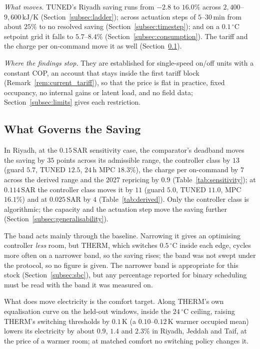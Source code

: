 \documentclass[3p,twocolumn,number]{elsarticle}
\newcommand{\SAR}{\text{SAR}}
\begin{document}
\emph{What moves.} TUNED's Riyadh saving runs from $-2.8$ to $16.0\%$ across $2{,}400$--$9{,}600\,\text{kJ/K}$ (Section~\ref{subsec:ladder}); across actuation steps of $5$--$30\,$min from about $25\%$ to no resolved saving (Section~\ref{subsec:timestep}); and on a $0.1\,^\circ$C setpoint grid it falls to $5.7$--$8.4\%$ (Section~\ref{subsec:consumption}). The tariff and the charge per on-command move it as well (Section~\ref{subsec:disc_band}).

\emph{Where the findings stop.} They are established for single-speed on/off units with a constant COP, an account that stays inside the first tariff block (Remark~\ref{rem:current_tariff}), so that the price is flat in practice, fixed occupancy, no internal gains or latent load, and no field data; Section~\ref{subsec:limits} gives each restriction.

\subsection{What Governs the Saving}
\label{subsec:disc_band}
\label{subsec:disc_tariff}
\label{subsec:disc_modele}

In Riyadh, at the $0.15\,\SAR$ sensitivity case, the comparator's deadband moves the saving by $35$ points across its admissible range, the controller class by $13$ (guard $5.7$, TUNED $12.5$, $24\,$h MPC $18.3\%$), the charge per on-command by $7$ across the derived range and the 2027 repricing by $0.9$ (Table~\ref{tab:sensitivity}); at $0.114\,\SAR$ the controller class moves it by $11$ (guard $5.0$, TUNED $11.0$, MPC $16.1\%$) and at $0.025\,\SAR$ by $4$ (Table~\ref{tab:derived}). Only the controller class is algorithmic; the capacity and the actuation step move the saving further (Section~\ref{subsec:generalisability}).

The band acts mainly through the baseline. Narrowing it gives an optimising controller \emph{less} room, but THERM, which switches $0.5\,^\circ$C inside each edge, cycles more often on a narrower band, so the saving rises; the band was not swept under the protocol, so no figure is given. The narrower band is appropriate for this stock (Section~\ref{subsec:sbc}), but any percentage reported for binary scheduling must be read with the band it was measured on.

What does move electricity is the comfort target. Along THERM's own equalisation curve on the held-out windows, inside the $24\,^\circ$C ceiling, raising THERM's switching thresholds by $0.1\,$K (a $0.10$--$0.12\,$K warmer occupied mean) lowers its electricity by about $0.9$, $1.4$ and $2.3\%$ in Riyadh, Jeddah and Taif, at the price of a warmer room; at matched comfort no switching policy changes it.
\end{document}
